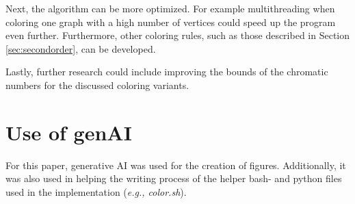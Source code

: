 \documentclass{article}
\begin{document}
Next, the algorithm can be more optimized. For example multithreading when coloring one graph with a high number of vertices could speed up the program even further. Furthermore, other coloring rules, such as those described in Section \ref{sec:secondorder}, can be developed.

Lastly, further research could include improving the bounds of the chromatic numbers for the discussed coloring variants. 


\section*{Use of genAI}

For this paper, generative AI was used for the creation of figures. Additionally, it was also used in helping the writing process of the helper bash- and python files used in the implementation (\textit{e.g., color.sh}).



%

%

	
	
\end{document}
